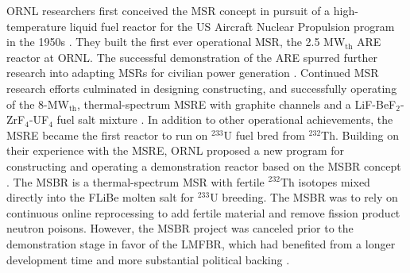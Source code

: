 \gls{ORNL} researchers first conceived the \gls{MSR} concept in pursuit of a high-temperature
liquid fuel reactor for the US Aircraft Nuclear Propulsion program in
the 1950s \cite{rosenthal_molten-salt_1970}. They
built the first ever operational \gls{MSR}, the 2.5 MW$_{\text{th}}$
\gls{ARE} reactor at \gls{ORNL}. The successful demonstration of the \gls{ARE} spurred further
research into adapting \glspl{MSR} for civilian power generation \cite{rosenthal_molten-salt_1970}.
Continued \gls{MSR} research efforts culminated in designing constructing, and successfully
operating of the 8-MW$_{\text{th}}$, thermal-spectrum \gls{MSRE} with
graphite channels and a LiF-BeF$_2$-ZrF$_4$-UF$_4$ fuel salt mixture
\cite{haubenreich_experience_1970}. In addition to other operational achievements, the
\gls{MSRE} became the first reactor to run on $^{233}$U fuel bred from $^{232}$Th. Building on
their experience with the \gls{MSRE}, \gls{ORNL} proposed a new program for constructing and
operating a demonstration reactor based on the \gls{MSBR} concept
\cite{macpherson_molten_1985}. The \gls{MSBR} is a thermal-spectrum \gls{MSR} with fertile
$^{232}$Th isotopes mixed directly into the \gls{FLiBe} molten salt for $^{233}$U breeding. The
\gls{MSBR} was to rely on continuous online reprocessing to add fertile
material and remove fission product neutron poisons.
However, the \gls{MSBR} project was canceled prior to the demonstration stage in
favor of the \gls{LMFBR}, which had benefited from a longer development time and more substantial
political backing \cite{macpherson_molten_1985}.

